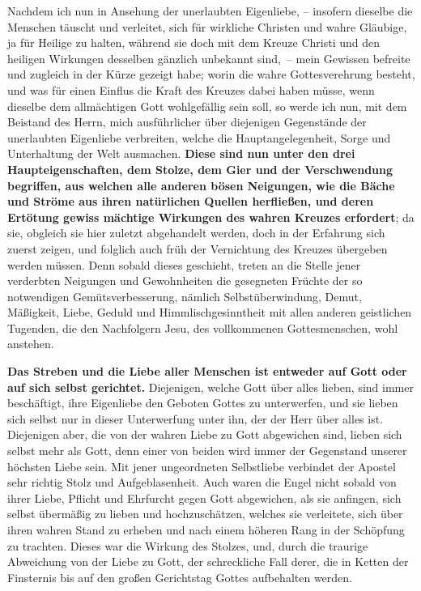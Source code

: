 Nachdem ich nun in Ansehung der unerlaubten Eigenliebe, -- insofern dieselbe die
Menschen täuscht und verleitet, sich für wirkliche Christen und wahre Gläubige,
ja für Heilige zu halten, während sie doch mit dem Kreuze Christi und den
heiligen Wirkungen desselben gänzlich unbekannt sind,~-- mein Gewissen befreite
und zugleich in der Kürze gezeigt habe;
worin die wahre Gottesverehrung
besteht, und was für einen Einflus die Kraft des Kreuzes dabei haben müsse,
wenn dieselbe dem allmächtigen Gott wohlgefällig sein soll, so werde ich nun,
mit dem Beistand des Herrn, mich ausführlicher über diejenigen Gegenstände der
unerlaubten Eigenliebe verbreiten, welche die
Hauptangelegenheit, Sorge und
Unterhaltung der Welt ausmachen.\label{ref:07_01_drei_haupteigenschaften}
\textbf{Diese sind nun unter den drei
Haupteigenschaften, dem Stolze, dem Gier und der
Verschwendung
 begriffen, aus
welchen alle anderen bösen Neigungen, wie die Bäche und Ströme aus ihren
natürlichen Quellen herfließen, und deren Ertötung gewiss mächtige Wirkungen
des wahren Kreuzes erfordert}; da sie, obgleich sie hier zuletzt abgehandelt
werden, doch in der Erfahrung sich zuerst zeigen, und folglich auch früh der
Vernichtung des Kreuzes übergeben werden müssen. Denn sobald dieses geschieht,
treten an die Stelle jener verderbten Neigungen und Gewohnheiten die gesegneten
Früchte der so notwendigen Gemütsverbesserung, nämlich
Selbstüberwindung,
Demut, Mäßigkeit, Liebe,
Geduld und Himmlischgesinntheit mit allen anderen
geistlichen Tugenden, die den Nachfolgern Jesu, des vollkommenen
Gottesmenschen,
wohl anstehen.

\medskip

\textbf{Das Streben und die Liebe aller Menschen ist
entweder auf Gott oder auf sich
selbst gerichtet.} Diejenigen, welche Gott über alles lieben, sind immer
beschäftigt, ihre Eigenliebe den Geboten Gottes zu unterwerfen, und sie lieben
sich selbst nur in dieser Unterwerfung unter ihn, der der Herr über alles ist.
Diejenigen aber, die von der wahren Liebe zu Gott abgewichen sind, lieben sich
selbst mehr als Gott, denn einer von beiden wird immer der Gegenstand unserer
höchsten Liebe sein. Mit jener ungeordneten Selbstliebe verbindet der Apostel
sehr richtig Stolz und Aufgeblasenheit.
Auch waren die
Engel nicht sobald von ihrer Liebe,
Pflicht und Ehrfurcht gegen Gott abgewichen,
als sie anfingen, sich selbst übermäßig zu lieben und hochzuschätzen, welches
sie verleitete, sich über ihren wahren Stand zu erheben und nach einem höheren
Rang in der Schöpfung zu trachten. Dieses war die Wirkung
des Stolzes, und,
durch die traurige Abweichung von der Liebe zu Gott, der schreckliche Fall
derer, die in Ketten der Finsternis bis auf den großen Gerichtstag
Gottes
aufbehalten werden.

